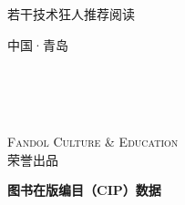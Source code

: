 \frontmatter
\pagestyle{empty}
\begin{titlepage}
    \textsf{ \huge 若干技术狂人推荐阅读 }
    \vspace{3cm}
    \begin{center}
    {\fontsize{40bp}{\baselineskip}\sffamily\bfseries \thetitle}

    \vspace{2cm}
    {\Huge {}}

    \vspace{1.2cm}
    {\huge {}}

    \vspace{13cm}

    {\huge \sffamily \thepublisher{}\quad 中国·青岛}
    \end{center}
\end{titlepage}

\cleardoublepage

\vspace*{3cm}
\begin{center}
    {\Huge \sffamily \thetitle\\[1em]}
    {\Large\bf\theauthors\\[2em]}
    \thedate\\
    \theversion
\end{center}

\vfill
\begin{center}
    \scshape{Fandol Culture \& Education}\\
    { \Large \sffamily { \bfseries \thepublisher} \quad 荣誉出品 }
\end{center}

\newpage
\vspace*{2cm}
\noindent\quad \textbf{图书在版编目（CIP）数据}
\vspace{1em}

